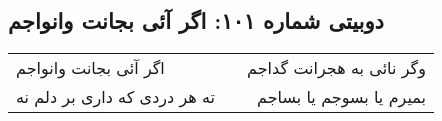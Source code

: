 \begin{center}
\section*{دوبیتی شماره ۱۰۱: اگر آئی بجانت وانواجم}
\label{sec:101}
\begin{longtable}{l p{0.5cm} r}
اگر آئی بجانت وانواجم
&&
وگر نائی به هجرانت گداجم
\\
ته هر دردی که داری بر دلم نه
&&
بمیرم یا بسوجم یا بساجم
\\
\end{longtable}
\end{center}
